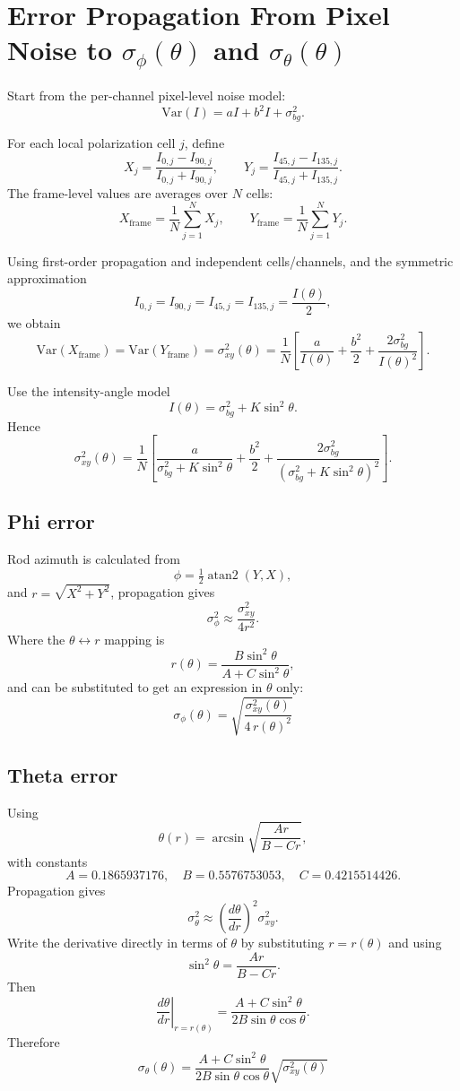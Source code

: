 \documentclass[11pt]{article}
\begin{document}
\section*{Error Propagation From Pixel Noise to $\sigma_\phi(\theta)$ and $\sigma_\theta(\theta)$}

Start from the per-channel pixel-level noise model:
\[
\mathrm{Var}(I)=aI+b^2 I+\sigma_{bg}^2.
\]

For each local polarization cell $j$, define
\[
X_j=\frac{I_{0,j}-I_{90,j}}{I_{0,j}+I_{90,j}},
\qquad
Y_j=\frac{I_{45,j}-I_{135,j}}{I_{45,j}+I_{135,j}}.
\]
The frame-level values are averages over $N$ cells:
\[
X_{\text{frame}}=\frac{1}{N}\sum_{j=1}^N X_j,
\qquad
Y_{\text{frame}}=\frac{1}{N}\sum_{j=1}^N Y_j.
\]

Using first-order propagation and independent cells/channels, and the symmetric approximation
\[
I_{0,j}=I_{90,j}=I_{45,j}=I_{135,j}=\frac{I(\theta)}{2},
\]
we obtain
\[
\mathrm{Var}(X_{\text{frame}})=\mathrm{Var}(Y_{\text{frame}})
=\sigma_{xy}^2(\theta)
=\frac{1}{N}\left[
\frac{a}{I(\theta)}+\frac{b^2}{2}+\frac{2\sigma_{bg}^2}{I(\theta)^2}
\right].
\]

Use the intensity-angle model
\[
I(\theta)=\sigma_{bg}^2+K\sin^2\theta.
\]
Hence
\[
\sigma_{xy}^2(\theta)=\frac{1}{N}\left[
\frac{a}{\sigma_{bg}^2+K\sin^2\theta}
+\frac{b^2}{2}
+\frac{2\sigma_{bg}^2}{\left(\sigma_{bg}^2+K\sin^2\theta\right)^2}
\right].
\]

\subsection*{Phi error}
Rod azimuth is calculated from
\[
\phi=\tfrac12\operatorname{atan2}(Y,X),
\]
and $r=\sqrt{X^2+Y^2}$, propagation gives
\[
\sigma_\phi^2\approx\frac{\sigma_{xy}^2}{4r^2}.
\]
Where the $\theta\leftrightarrow r$ mapping is
\[
r(\theta)=\frac{B\sin^2\theta}{A+C\sin^2\theta},
\]
and can be substituted to get an expression in $\theta$ only:
\[
\boxed{
\sigma_\phi(\theta)=
\sqrt{
\frac{\sigma_{xy}^2(\theta)}{4\,r(\theta)^2}
}
}
\]

\subsection*{Theta error}
Using
\[
\theta(r)=\arcsin\sqrt{\frac{Ar}{B-Cr}},
\]
with constants
\[
A=0.1865937176,\quad B=0.5576753053,\quad C=0.4215514426.
\]
Propagation gives
\[
\sigma_\theta^2\approx\left(\frac{d\theta}{dr}\right)^2\sigma_{xy}^2.
\]
Write the derivative directly in terms of $\theta$ by substituting $r=r(\theta)$ and using
\[
\sin^2\theta=\frac{Ar}{B-Cr}.
\]
Then
\[
\left.\frac{d\theta}{dr}\right|_{r=r(\theta)}
=
\frac{A+C\sin^2\theta}{2B\sin\theta\cos\theta}.
\]
Therefore
\[
\boxed{
\sigma_\theta(\theta)=
\frac{A+C\sin^2\theta}{2B\sin\theta\cos\theta}
\sqrt{\sigma_{xy}^2(\theta)}
}
\]
\end{document}
